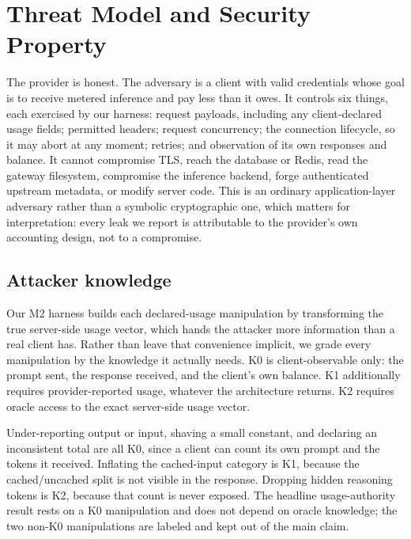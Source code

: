 \documentclass[preprint,3p,authoryear,12pt]{elsarticle}
\begin{document}
\section{Threat Model and Security Property}
\label{sec:threat}
The provider is honest. The adversary is a client with valid credentials whose goal is to
receive metered inference and pay less than it owes. It controls six things, each
exercised by our harness: request payloads, including any client-declared usage fields;
permitted headers; request concurrency; the connection lifecycle, so it may abort at any
moment; retries; and observation of its own responses and balance. It cannot compromise
TLS, reach the database or Redis, read the gateway filesystem, compromise the inference
backend, forge authenticated upstream metadata, or modify server code. This is an
ordinary application-layer adversary rather than a symbolic cryptographic one, which
matters for interpretation: every leak we report is attributable to the provider's own
accounting design, not to a compromise.

\subsection{Attacker knowledge}
Our M2 harness builds each declared-usage manipulation by transforming the true
server-side usage vector, which hands the attacker more information than a real client
has. Rather than leave that convenience implicit, we grade every manipulation by the
knowledge it actually needs. K0 is client-observable only: the prompt sent, the response
received, and the client's own balance. K1 additionally requires provider-reported usage,
whatever the architecture returns. K2 requires oracle access to the exact server-side
usage vector.

Under-reporting output or input, shaving a small constant, and declaring an inconsistent
total are all K0, since a client can count its own prompt and the tokens it received.
Inflating the cached-input category is K1, because the cached/uncached split is not
visible in the response. Dropping hidden reasoning tokens is K2, because that count is
never exposed. The headline usage-authority result rests on a K0 manipulation and does not
depend on oracle knowledge; the two non-K0 manipulations are labeled and kept out of the
main claim.
\end{document}
